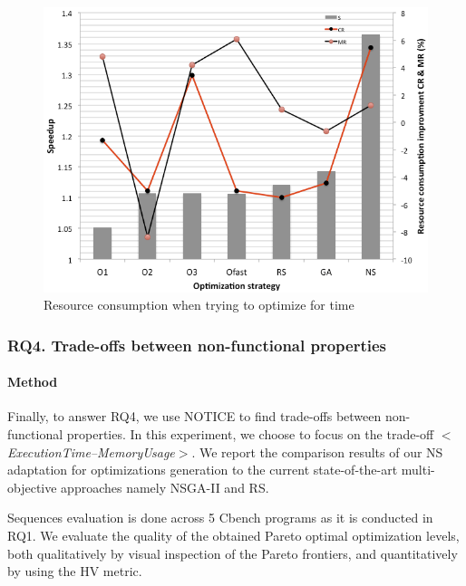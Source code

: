 \begin{figure}[h]
	\centering
	\includegraphics[width=1.\linewidth]{Ressources/rq3.png}
	\caption{Resource consumption when trying to optimize for time}
\end{figure}

\noindent{}
\subsubsection{RQ4. Trade-offs between non-functional properties}
\paragraph{Method}

Finally, to answer RQ4, we use NOTICE to find trade-offs between non-functional properties. In this experiment, we choose to focus on the trade-off \textit{$<$ExecutionTime--MemoryUsage$>$}. We report the comparison results of our NS adaptation for optimizations generation to the current state-of-the-art multi-objective approaches namely NSGA-II and RS. 
  
Sequences evaluation is done across 5 Cbench programs as it is conducted in RQ1.
We evaluate the quality of the obtained Pareto optimal optimization levels, both qualitatively by visual inspection of the Pareto frontiers, and quantitatively by using the HV metric.



